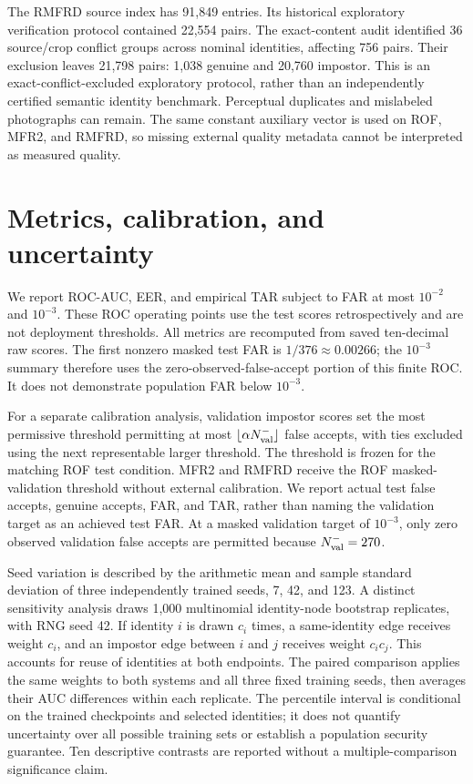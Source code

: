 \documentclass[12pt,a4paper,oneside]{report}
\begin{document}
The RMFRD source index has 91,849 entries. Its historical exploratory verification protocol contained 22,554 pairs. The exact-content audit identified 36 source/crop conflict groups across nominal identities, affecting 756 pairs. Their exclusion leaves 21,798 pairs: 1,038 genuine and 20,760 impostor. This is an exact-conflict-excluded exploratory protocol, rather than an independently certified semantic identity benchmark. Perceptual duplicates and mislabeled photographs can remain. The same constant auxiliary vector is used on ROF, MFR2, and RMFRD, so missing external quality metadata cannot be interpreted as measured quality.

\section{Metrics, calibration, and uncertainty}
We report ROC-AUC, EER, and empirical TAR subject to FAR at most $10^{-2}$ and $10^{-3}$. These ROC operating points use the test scores retrospectively and are not deployment thresholds. All metrics are recomputed from saved ten-decimal raw scores. The first nonzero masked test FAR is $1/376\approx0.00266$; the $10^{-3}$ summary therefore uses the zero-observed-false-accept portion of this finite ROC. It does not demonstrate population FAR below $10^{-3}$.

For a separate calibration analysis, validation impostor scores set the most permissive threshold permitting at most $\lfloor\alpha N_{\rm val}^{-}\rfloor$ false accepts, with ties excluded using the next representable larger threshold. The threshold is frozen for the matching ROF test condition. MFR2 and RMFRD receive the ROF masked-validation threshold without external calibration. We report actual test false accepts, genuine accepts, FAR, and TAR, rather than naming the validation target as an achieved test FAR. At a masked validation target of $10^{-3}$, only zero observed validation false accepts are permitted because $N_{\rm val}^{-}=270$.

Seed variation is described by the arithmetic mean and sample standard deviation of three independently trained seeds, 7, 42, and 123. A distinct sensitivity analysis draws 1,000 multinomial identity-node bootstrap replicates, with RNG seed 42. If identity $i$ is drawn $c_i$ times, a same-identity edge receives weight $c_i$, and an impostor edge between $i$ and $j$ receives weight $c_i c_j$. This accounts for reuse of identities at both endpoints. The paired comparison applies the same weights to both systems and all three fixed training seeds, then averages their AUC differences within each replicate. The percentile interval is conditional on the trained checkpoints and selected identities; it does not quantify uncertainty over all possible training sets or establish a population security guarantee. Ten descriptive contrasts are reported without a multiple-comparison significance claim.
\end{document}
